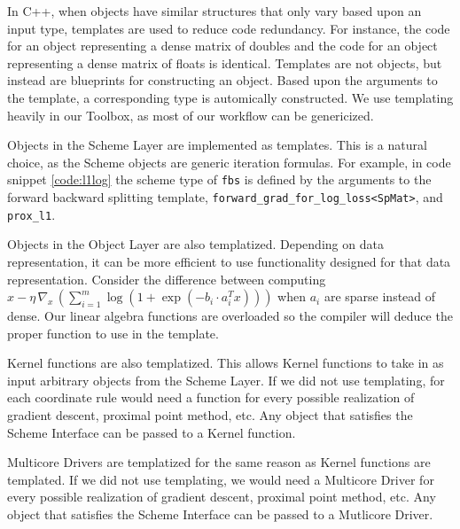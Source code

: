 In C++, when objects have similar structures that only vary based upon an input type, templates are used to reduce code redundancy. For instance, the code for an object representing a dense matrix of doubles and the code for an object representing a dense matrix of floats is identical.
Templates are not objects, but instead are blueprints for constructing an object.
Based upon the arguments to the template, a corresponding type is automically constructed.
We use templating heavily in our Toolbox, as most of our workflow can be genericized.

Objects in the Scheme Layer are implemented as templates.
This is a natural choice, as the Scheme objects are generic iteration formulas.
For example, in code snippet \ref{code:l1log} the scheme type of \texttt{fbs} is defined by the arguments to the forward backward splitting template, \texttt{forward\_grad\_for\_log\_loss<SpMat>}, and \texttt{prox\_l1}.

Objects in the Object Layer are also templatized. Depending on data representation, it can be more efficient to use functionality designed for that data representation. Consider the difference between computing $x - \eta \, \nabla_x \,(\sum_{i = 1}^m \log (1 + \exp(-b_i \cdot a_i^T x)))$ when $a_i$ are sparse instead of dense.
Our linear algebra functions are overloaded so the compiler will deduce the proper function to use in the template.

Kernel functions are also templatized. This allows Kernel functions to take in as input arbitrary objects from the Scheme Layer. If we did not use templating, for each coordinate rule would need a function for every possible realization of gradient descent, proximal point method, etc.  Any object that satisfies the Scheme Interface can be passed to a Kernel function.

Multicore Drivers are templatized for the same reason as Kernel functions are templated. If we did not use templating, we would need a Multicore Driver for every possible realization of gradient descent, proximal point method, etc. Any object that satisfies the Scheme Interface can be passed to a Mutlicore Driver.
